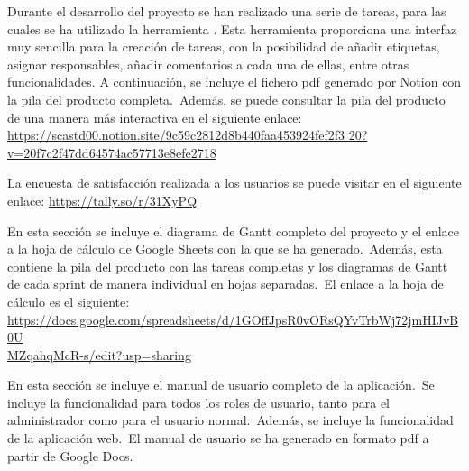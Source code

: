 


Durante el desarrollo del proyecto se han realizado una serie de tareas, para las cuales se ha utilizado la
herramienta .
Esta herramienta proporciona una interfaz muy sencilla para la creación de tareas, con la
posibilidad de añadir etiquetas, asignar responsables, añadir comentarios a cada una de ellas,
entre otras funcionalidades.
A continuación, se incluye el fichero pdf generado por Notion con la pila del producto completa.\ Además, se puede
consultar la pila del producto de una manera más interactiva en el siguiente enlace:
\href{https://scastd00.notion.site/9c59c2812d8b440faa453924fef2f320?v=20f7c2f47dd64574ac57713e8efe2718}
{https://scastd00.notion.site/9c59c2812d8b440faa453924fef2f3
20?v=20f7c2f47dd64574ac57713e8efe2718}

\label{anx:product-backlog-notion}




La encuesta de satisfacción realizada a los usuarios se puede visitar en el siguiente enlace:
\href{https://tally.so/r/31XyPQ}{https://tally.so/r/31XyPQ}
\label{anx:encuesta-satisfaccion}



En esta sección se incluye el diagrama de Gantt completo del proyecto y el enlace a la hoja de cálculo de Google
Sheets con la que se ha generado.\ Además, esta contiene la pila del producto con las tareas completas y los diagramas
de Gantt de cada sprint de manera individual en hojas separadas.\ El enlace a la hoja de cálculo es el siguiente:
\href{https://docs.google.com/spreadsheets/d/1GOffJpsR0vORsQYvTrbWj72jmHIJvB0UMZqahqMcR-s/edit?usp=sharing}
{https://docs.google.com/spreadsheets/d/1GOffJpsR0vORsQYvTrbWj72jmHIJvB0U\\MZqahqMcR-s/edit?usp=sharing}

\label{anx:gantt}




En esta sección se incluye el manual de usuario completo de la aplicación.\ Se incluye la funcionalidad para todos
los roles de usuario, tanto para el administrador como para el usuario normal.\ Además, se incluye la funcionalidad
de la aplicación web.\ El manual de usuario se ha generado en formato pdf a partir de Google Docs.


